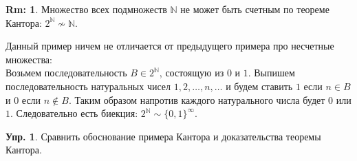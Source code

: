 \documentclass[12pt]{article}
\theoremstyle{definition}
\newtheorem{rem}{Rm:}
\newtheorem{exrc}{Упр.}
\begin{document}
\begin{rem}
	Множество всех подмножеств $\mathbb{N}$ не может быть счетным по теореме Кантора: $2^{\mathbb{N}} \nsim \mathbb{N}$.
\end{rem} 

Данный пример ничем не отличается от предыдущего примера про несчетные множества:\\ 
Возьмем последовательность $B \in 2^{\mathbb{N}}$, состоящую из $0$ и $1$. Выпишем последовательность натуральных чисел $1, 2, \dotsc, n, \dotsc$ и будем ставить $1$ если $n \in B$ и $0$ если $n \notin B$. Таким образом напротив каждого натурального числа будет $0$ или $1$. Следовательно есть биекция: $2^{\mathbb{N}} \sim \{0,1\}^{\infty}$.
 \begin{exrc}
 	Сравнить обоснование примера Кантора и доказательства теоремы Кантора.
 \end{exrc}
 
\end{document}

